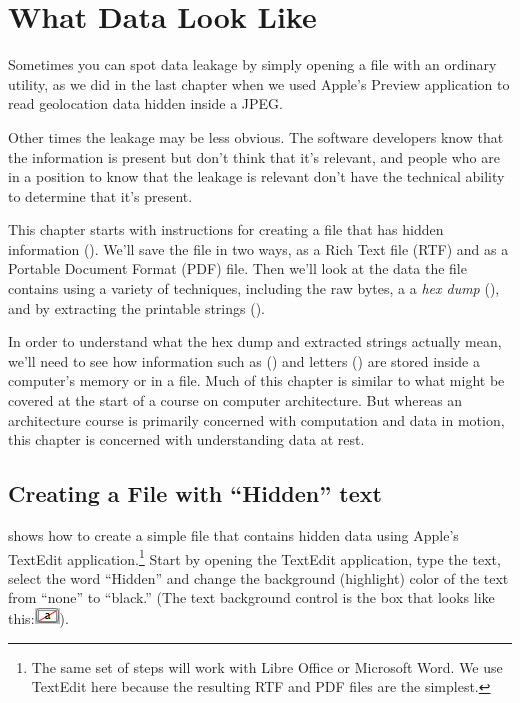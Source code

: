 \chapter{What Data Look Like}

Sometimes you can spot data leakage by simply opening a file with an
ordinary utility, as we did in the last chapter when we used Apple's
Preview application to read geolocation data hidden inside a JPEG. 

Other times the leakage may be less obvious.  The software developers
know that the information is present but don't think that it's
relevant, and people who are in a position to know that the leakage is
relevant don't have the technical ability to determine that it's
present.

This chapter starts with instructions for creating a file that has hidden information
(). We'll save the file in two ways, as a Rich
Text file (RTF) and as a Portable Document Format (PDF) file. Then
we'll look at the data the file contains using a variety of
techniques, including the raw bytes, a a \emph{hex dump}
(), and by extracting the printable strings
(). 

In order to understand what the hex dump and extracted strings
actually mean, we'll need to see how information such as 
() and letters () are 
stored inside a computer's memory or in a file.  Much of this chapter is similar to
what might be covered at the start of a course on computer
architecture. But whereas an architecture course is primarily
concerned with computation and data in motion, this chapter is
concerned with understanding data at rest.

\section{Creating a File with ``Hidden'' text}\label{sec:make-pdf}

 shows how to create a simple file that
contains hidden data using Apple's TextEdit application.\footnote{The
  same set of steps will work with Libre Office or Microsoft Word. We
  use TextEdit here because the resulting RTF and PDF files are the
  simplest.}
 Start by
opening the TextEdit application, type the text, select the word ``Hidden'' and
change the background (highlight) color of the text from ``none'' to
``black.'' (The text background control is the box that looks like this:\includegraphics[height=1.5ex]{ch-what/textedit_highlight_control}).


